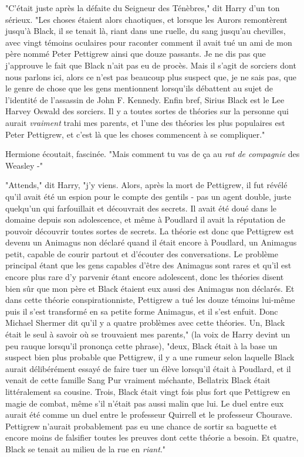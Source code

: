 "C'était juste après la défaite du Seigneur des Ténèbres," dit Harry d'un ton sérieux. "Les choses étaient alors chaotiques, et lorsque les Aurors remontèrent jusqu'à Black, il se tenait là, riant dans une ruelle, du sang jusqu'au chevilles, avec vingt témoins oculaires pour raconter comment il avait tué un ami de mon père nommé Peter Pettigrew ainsi que douze passants. Je ne dis pas que j'approuve le fait que Black n'ait pas eu de procès. Mais il s'agit de sorciers dont nous parlons ici, alors ce n'est pas beaucoup plus suspect que, je ne sais pas, que le genre de chose que les gens mentionnent lorsqu'ils débattent au sujet de l'identité de l'assassin de John F. Kennedy. Enfin bref, Sirius Black est le Lee Harvey Oswald des sorciers. Il y a toutes sortes de théories sur la personne qui aurait \emph{vraiment} trahi mes parents, et l'une des théories les plus populaires est Peter Pettigrew, et c'est là que les choses commencent à se compliquer."

Hermione écoutait, fascinée. "Mais comment tu vas de ça au \emph{rat} \emph{de compagnie} des Weasley -"

"Attends," dit Harry, "j'y viens. Alors, après la mort de Pettigrew, il fut révélé qu'il avait été un espion pour le compte des gentils - pas un agent double, juste quelqu'un qui farfouillait et découvrait des secrets. Il avait été doué dans le domaine depuis son adolescence, et même à Poudlard il avait la réputation de pouvoir découvrir toutes sortes de secrets. La théorie est donc que Pettigrew est devenu un Animagus non déclaré quand il était encore à Poudlard, un Animagus petit, capable de courir partout et d'écouter des conversations. Le problème principal étant que les gens capables d'être des Animagus sont rares et qu'il est encore plus rare d'y parvenir étant encore adolescent, donc les théories disent bien sûr que mon père et Black étaient eux aussi des Animagus non déclarés. Et dans cette théorie conspirationniste, Pettigrew a tué les douze témoins lui-même puis il s'est transformé en sa petite forme Animagus, et il s'est enfuit. Donc Michael Shermer dit qu'il y a quatre problèmes avec cette théories. Un, Black était le seul à savoir où se trouvaient mes parents," (la voix de Harry devint un peu rauque lorsqu'il prononça cette phrase), "deux, Black était à la base un suspect bien plus probable que Pettigrew, il y a une rumeur selon laquelle Black aurait délibérément essayé de faire tuer un élève lorsqu'il était à Poudlard, et il venait de cette famille Sang Pur vraiment méchante, Bellatrix Black était littéralement sa cousine. Trois, Black était vingt fois plus fort que Pettigrew en magie de combat, même s'il n'était pas aussi malin que lui. Le duel entre eux aurait été comme un duel entre le professeur Quirrell et le professeur Chourave. Pettigrew n'aurait probablement pas eu une chance de sortir sa baguette et encore moins de falsifier toutes les preuves dont cette théorie a besoin. Et quatre, Black se tenait au milieu de la rue en \emph{riant}."

